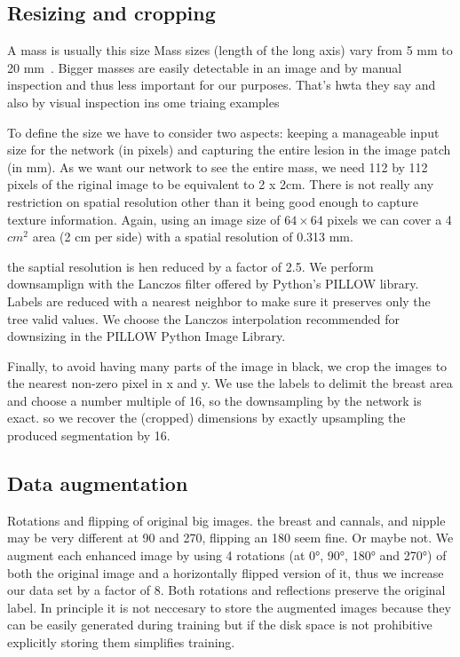 \subsection{Resizing and cropping}
A mass is usually this size
Mass sizes (length of the long axis) vary from 5 mm to 20 mm~\cite{Sahiner1996}. Bigger masses are easily detectable in an image and by manual inspection and thus less important for our purposes. 
That's hwta they say and also by visual inspection ins ome triaing examples

To define the size we have to consider two aspects: keeping a manageable input size for the network (in pixels) and capturing the entire lesion in the image patch (in mm).
As we want our network to see the entire mass, we need 112 by 112 pixels of the riginal image to be equivalent to 2 x 2cm. 
There is not really any restriction on spatial resolution other than it being good enough to capture texture information. Again, using an image size of $64 \times 64$ pixels we can cover a 4 $cm^2$ area (2 cm per side) with a spatial resolution of 0.313 mm.

the saptial resolution is hen reduced by a factor of 2.5. We perform downsamplign with the Lanczos filter offered by Python's PILLOW library. Labels are reduced with a nearest neighbor to make sure it preserves only the tree valid values.
We choose the Lanczos interpolation recommended for downsizing in the PILLOW Python Image Library.



Finally, to avoid having many parts of the image in black, we crop the images to the nearest non-zero pixel in x and y. We use the labels to delimit the breast area and choose a number multiple of 16, so the downsampling by the network is exact. so we recover the (cropped) dimensions by exactly upsampling the produced segmentation by 16.
	
\subsection{Data augmentation}
Rotations and flipping of original big images. the breast and cannals, and nipple may be very different at 90 and 270, flipping an 180 seem fine. Or maybe not.
We augment each enhanced image by using 4 rotations (at 0°, 90°, 180° and 270°) of both the original image and a horizontally flipped version of it, thus we increase our data set by a factor of 8. Both rotations and reflections preserve the original label. In principle it is not neccesary to store the augmented images because they can be easily generated during training but if the disk space is not prohibitive explicitly storing them simplifies training.

